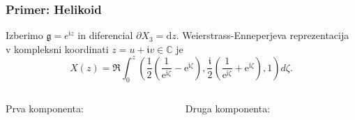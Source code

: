 \documentclass[8pt]{beamer}
\theoremstyle{definition}
\theoremstyle{remark}
\theoremstyle{plain}
\numberwithin{equation}{section}  %
\begin{document}
\begin{frame}
    \frametitle{Primer: Helikoid}

    Izberimo $\mathfrak{g} = e^{\mathfrak{i}z}$ in diferencial $\partial X_3 = \mathrm{d}z$. Weierstrass-Enneperjeva reprezentacija v kompleksni koordinati $z=u+\mathfrak{i} v \in \mathbb{C}$ je
    \begin{equation*}
        X(z)=\Re \int_0^z\left(\frac{1}{2}\left(\frac{1}{\mathrm{e}^{\mathrm{i} \zeta}}-\mathrm{e}^{\mathrm{i} \zeta}\right), \frac{\mathfrak{i}}{2}\left(\frac{1}{\mathrm{e}^{\mathrm{i} \zeta}}+\mathrm{e}^{\mathrm{i} \zeta}\right), 1\right) d \zeta .
    \end{equation*}
    \pause
    \begin{columns}
        \begin{column}{0.475\textwidth}
            Prva komponenta:
        \end{column}
        \pause
        \begin{column}{0.475\textwidth}
            Druga komponenta:
\end{column}
\end{columns}
\end{frame}
\end{document}
